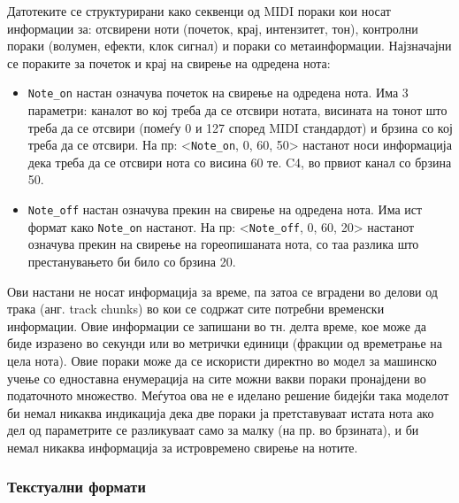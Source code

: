 Датотеките се структурирани како секвенци од MIDI пораки кои носат информации за: отсвирени ноти (почеток, крај, интензитет, тон), контролни пораки (волумен, ефекти, клок сигнал) и пораки со метаинформации. Најзначајни се пораките за почеток и крај на свирење на одредена нота:
\begin{itemize}
    \item \texttt{Note\_on} настан означува почеток на свирење на одредена нота. Има 3 параметри: каналот во кој треба да се отсвири нотата, висината на тонот што треба да се отсвири (помеѓу 0 и 127 според MIDI стандардот) и брзина со кој треба да се отсвири. На пр: <\texttt{Note\_on}, 0, 60, 50> настанот носи информација дека треба да се отсвири нота со висина 60 те. C4, во првиот канал со брзина 50.
    \item \texttt{Note\_off} настан означува прекин на свирење на одредена нота. Има ист формат како \texttt{Note\_on} настанот. На пр: <\texttt{Note\_off}, 0, 60, 20> настанот означува прекин на свирење на гореопишаната нота, со таа разлика што престанувањето би било со брзина 20.
\end{itemize}
Ови настани не носат информација за време, па затоа се вградени во делови од трака (анг. track chunks) во кои се содржат сите потребни временски информации. Овие информации се запишани во тн. делта време, кое може да биде изразено во секунди или во метрички единици (фракции од времетрање на цела нота).
Овие пораки може да се искористи директно во модел за машинско учење со едноставна енумерација на сите можни вакви пораки пронајдени во податочното множество. Меѓутоа ова не е иделано решение бидејќи така моделот би немал никаква индикација дека две пораки ја претставуваат истата нота ако дел од параметрите се разликуваат само за малку (на пр. во брзината), и би немал никаква информација за истровремено свирење на нотите.

\subsubsection{Текстуални формати}

